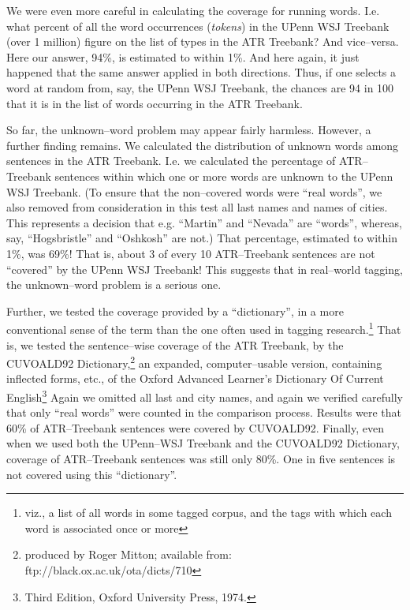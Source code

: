 We were even more careful in calculating the coverage for running
words.  I.e. what percent of all the word occurrences ({\em tokens})
in the UPenn WSJ Treebank (over 1 million) figure on the list of types
in the ATR Treebank? And vice--versa. Here our answer, 94\%, is
estimated to within 1\%. And here again, it just happened that the
same answer applied in both directions.  Thus, if one selects a word
at random from, say, the UPenn WSJ Treebank, the chances are 94 in 100
that it is in the list of words occurring in the ATR Treebank.

So far, the unknown--word problem may appear fairly harmless. However,
a further finding remains. We calculated the distribution of unknown
words among sentences in the ATR Treebank. I.e. we calculated the
percentage of ATR--Treebank sentences within which one or more words
are unknown to the UPenn WSJ Treebank.  (To ensure that the
non--covered words were ``real words'', we also removed from
consideration in this test all last names and names of cities. This
represents a decision that e.g. ``Martin'' and ``Nevada'' are
``words'', whereas, say, ``Hogsbristle'' and ``Oshkosh'' are not.) 
That percentage, estimated to within 1\%, was 69\%! That is, about 3
of every 10 ATR--Treebank sentences are not ``covered'' by the UPenn
WSJ Treebank! This suggests that in real--world tagging, the
unknown--word problem is a serious one.

Further, we tested the coverage provided by a ``dictionary'', in a
more conventional sense of the term than the one often used in tagging
research.\footnote{viz., a list of all words in some tagged corpus,
and the tags with which each word is associated once or more} That is,
we tested the sentence--wise coverage of the ATR Treebank, by the
CUVOALD92 Dictionary,\footnote{produced by Roger Mitton; available
from: ftp://black.ox.ac.uk/ota/dicts/710} an expanded,
computer--usable version, containing inflected forms, etc., of the
Oxford Advanced Learner's Dictionary Of Current English\footnote{Third
Edition, Oxford University Press, 1974.} Again we omitted all last and
city names, and again we verified carefully that only ``real words''
were counted in the comparison process.  Results were that 60\% of
ATR--Treebank sentences were covered by CUVOALD92. Finally, even when
we used both the UPenn--WSJ Treebank and the CUVOALD92 Dictionary,
coverage of ATR--Treebank sentences was still only 80\%. One in five
sentences is not covered using this ``dictionary''.


